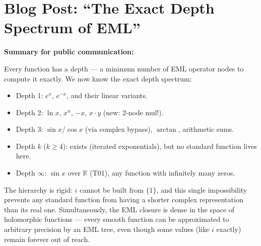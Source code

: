 \documentclass[11pt]{article}
\begin{document}
\section{Blog Post: ``The Exact Depth Spectrum of EML''}

\noindent\textbf{Summary for public communication:}

Every function has a depth --- a minimum number of EML operator nodes to compute it
exactly.  We now know the exact depth spectrum:
\begin{itemize}
\item Depth 1: $e^x$, $e^{-x}$, and their linear variants.
\item Depth 2: $\ln x$, $x^n$, $-x$, $x \cdot y$ (new: 2-node mul!).
\item Depth 3: $\sin x$/$\cos x$ (via complex bypass), $\arctan$, arithmetic sums.
\item Depth $k$ ($k \geq 4$): exists (iterated exponentials), but no standard function lives here.
\item Depth $\infty$: $\sin x$ over $\mathbb{R}$ (T01), any function with infinitely many zeros.
\end{itemize}

The hierarchy is rigid: $i$ cannot be built from $\{1\}$, and this single
impossibility prevents any standard function from having a shorter complex
representation than its real one.  Simultaneously, the EML closure is dense
in the space of holomorphic functions --- every smooth function can be approximated
to arbitrary precision by an EML tree, even though some values (like $i$ exactly)
remain forever out of reach.
\end{document}
